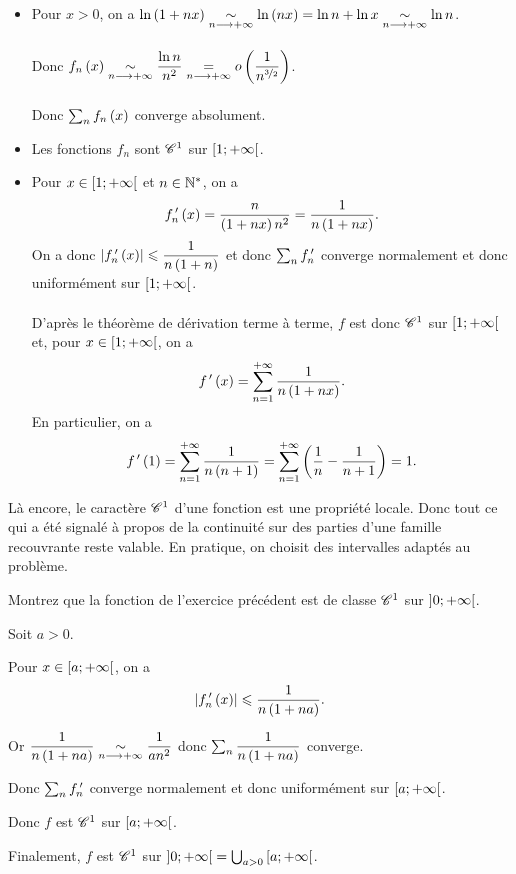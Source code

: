 \begin{corr}
\begin{itemize}
    \item Pour \(x>0\), on a \(\ln\left(1+nx\right)\underset{n\longrightarrow+\infty}{\sim}\ln\left(nx\right)=\ln n+\ln x\underset{n\longrightarrow+\infty}{\sim}\ln n\). \\\\ Donc \(f_n\left(x\right)\underset{n\longrightarrow+\infty}{\sim}\dfrac{\ln n}{n^2}\underset{n\longrightarrow+\infty}{=}o\left(\dfrac{1}{n^{\nicefrac{3}{2}}}\right)\). \\\\ Donc \(\sum_nf_n\left(x\right)\) converge absolument. \\
    \item Les fonctions \(f_n\) sont \(\mathscr{C}^{1}\) sur \(\left[1;+\infty\right[\). \\
    \item Pour \(x\in\left[1;+\infty\right[\) et \(n\in\mathbb{N}^*\), on a \[f_n^{\,\prime}\left(x\right)=\dfrac{n}{\left(1+nx\right)n^2}=\dfrac{1}{n\left(1+nx\right)}.\] On a donc \(\left\lvert f_n^{\,\prime}\left(x\right)\right\rvert\leqslant\dfrac{1}{n\left(1+n\right)}\) et donc \(\sum_nf_n^{\,\prime}\) converge normalement et donc uniformément sur \(\left[1;+\infty\right[\). \\\\ D'après le théorème de dérivation terme à terme, \(f\) est donc \(\mathscr{C}^{1}\) sur \(\left[1;+\infty\right[\) et, pour \(x\in\left[1;+\infty\right[\), on a \[f^{\,\prime}\left(x\right)=\sum_{n=1}^{+\infty}\dfrac{1}{n\left(1+nx\right)}.\] En particulier, on a \[f^{\,\prime}\left(1\right)=\sum_{n=1}^{+\infty}\dfrac{1}{n\left(n+1\right)}=\sum_{n=1}^{+\infty}\left(\dfrac{1}{n}-\dfrac{1}{n+1}\right)=1.\]
\end{itemize}
\end{corr}

\begin{rem}
Là encore, le caractère \(\mathscr{C}^{1}\) d'une fonction est une propriété locale. Donc tout ce qui a été signalé à propos de la continuité sur des parties d'une famille recouvrante reste valable. En pratique, on choisit des intervalles adaptés au problème.
\end{rem}

\begin{exo}
Montrez que la fonction de l'exercice précédent est de classe \(\mathscr{C}^{1}\) sur \(\left]0;+\infty\right[\).
\end{exo}

\begin{corr}
Soit \(a>0\).

Pour \(x\in\left[a;+\infty\right[\), on a \[\left\lvert f_n^{\,\prime}\left(x\right)\right\rvert\leqslant\dfrac{1}{n\left(1+na\right)}.\]

Or \(\dfrac{1}{n\left(1+na\right)}\underset{n\longrightarrow+\infty}{\sim}\dfrac{1}{an^2}\) donc \(\sum_n\dfrac{1}{n\left(1+na\right)}\) converge.

Donc \(\sum_nf_n^{\,\prime}\) converge normalement et donc uniformément sur \(\left[a;+\infty\right[\).

Donc \(f\) est \(\mathscr{C}^{1}\) sur \(\left[a;+\infty\right[\).

Finalement, \(f\) est \(\mathscr{C}^{1}\) sur \(\left]0;+\infty\right[=\bigcup_{a>0}\left[a;+\infty\right[\).
\end{corr}


